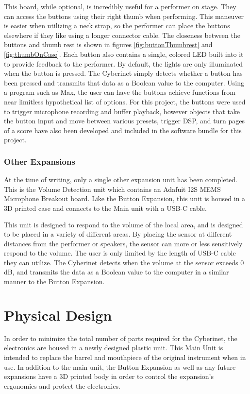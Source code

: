 This board, while optional, is incredibly useful for a performer on stage. They can access the buttons using their right thumb when performing. This maneuver is easier when utilizing a neck strap, so the performer can place the buttons elsewhere if they like using a longer connector cable. The closeness between the buttons and thumb rest is shown in figures \ref{fig:buttonThumbrest} and \ref{fig:thumbOnCase}. Each button also contains a single, colored LED built into it to provide feedback to the performer. By default, the lights are only illuminated when the button is pressed. The Cyberinet simply detects whether a button has been pressed and transmits that data as a Boolean value to the computer. Using a program such as Max, the user can have the buttons achieve functions from near limitless hypothetical list of options. For this project, the buttons were used to trigger microphone recording and buffer playback, however objects that take the button input and move between various presets, trigger DSP, and turn pages of a score have also been developed and included in the software bundle for this project.

\subsubsection{Other Expansions}
At the time of writing, only a single other expansion unit has been completed. This is the Volume Detection unit which contains an Adafuit I2S MEMS Microphone Breakout board. Like the Button Expansion, this unit is housed in a 3D printed case and connects to the Main unit with a USB-C cable. 

This unit is designed to respond to the volume of the local area, and is designed to be placed in a variety of different areas. By placing the sensor at different distances from the performer or speakers, the sensor can more or less sensitively respond to the volume. The user is only limited by the length of USB-C cable they can utilize. The Cyberinet detects when the volume at the sensor exceeds 0 dB, and transmits the data as a Boolean value to the computer in a similar manner to the Button Expansion.

\section{Physical Design}
In order to minimize the total number of parts required for the Cyberinet, the electronics are housed in a newly designed plastic unit. This Main Unit is intended to replace the barrel and mouthpiece of the original instrument when in use. In addition to the main unit, the Button Expansion as well as any future expansions have a 3D printed body in order to control the expansion's ergonomics and protect the electronics.

